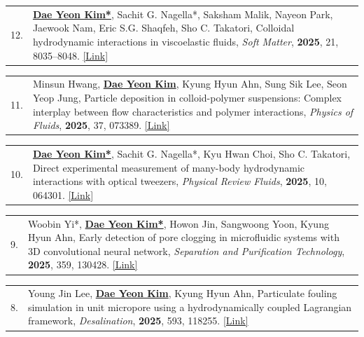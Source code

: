 \documentclass[11pt, a4paper]{article}
\makeatletter
\newenvironment{pubitem}[2]{%
  \begin{tabularx}{\textwidth}{@{}p{1cm}X@{}}
  #1 & #2 \\
  \end{tabularx}
}{}
\makeatother
\begin{document}
    \vspace{0.3em}

    \begin{pubitem}{12.}{\textbf{\underline{Dae Yeon Kim*}}, Sachit G. Nagella*, Saksham Malik, Nayeon Park, Jaewook Nam, Eric S.G. Shaqfeh, Sho C. Takatori, Colloidal hydrodynamic interactions in viscoelastic fluids, \textit{Soft Matter}, \textbf{2025}, 21, 8035--8048. \href{https://pubs.rsc.org/en/content/articlelanding/2025/sm/d5sm00874c}{[Link]}} 
    \end{pubitem}
    
    \vspace{0.3em}
    
    \begin{pubitem}{11.}{Minsun Hwang, \textbf{\underline{Dae Yeon Kim}},  Kyung Hyun Ahn, Sung Sik Lee, Seon Yeop Jung, 
    Particle deposition in colloid-polymer suspensions: Complex interplay between flow characteristics and polymer interactions, 
    \textit{Physics of Fluids}, \textbf{2025}, 37, 073389. \href{ https://doi.org/10.1063/5.0277046}{[Link]}}
    \end{pubitem}

    \vspace{0.3em}


    
    \begin{pubitem}{10.}{\textbf{\underline{Dae Yeon Kim*}}, Sachit G. Nagella*, Kyu Hwan Choi, Sho C. Takatori, 
    Direct experimental measurement of many-body hydrodynamic interactions with optical tweezers, 
    \textit{Physical Review Fluids}, \textbf{2025}, 10, 064301. \href{ https://doi.org/10.1103/PhysRevFluids.10.064301}{[Link]}}
    \end{pubitem}

    \vspace{0.3em}

    
    \begin{pubitem}{9.}{Woobin Yi*, \textbf{\underline{Dae Yeon Kim*}}, Howon Jin, Sangwoong Yoon, Kyung Hyun Ahn, Early detection of pore clogging in microfluidic systems with 3D convolutional neural network, 
    \textit{Separation and Purification Technology}, \textbf{2025}, 359, 130428. 
    \href{https://doi.org/10.1016/j.seppur.2024.130428}{[Link]}}
    \end{pubitem}
    
    \vspace{0.3em}
    
    \begin{pubitem}{8.}{Young Jin Lee, \textbf{\underline{Dae Yeon Kim}}, Kyung Hyun Ahn, 
    Particulate fouling simulation in unit micropore using a hydrodynamically coupled Lagrangian framework, 
    \textit{Desalination}, \textbf{2025}, 593, 118255. 
    \href{https://doi.org/10.1016/j.desal.2024.118255}{[Link]}}
    \end{pubitem}
    
\end{document}
